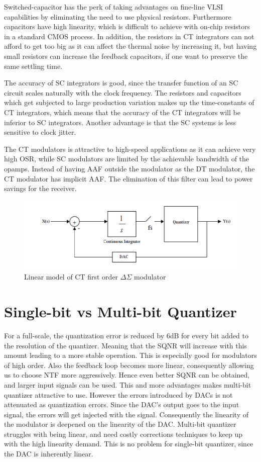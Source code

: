 Switched-capacitor has the perk of taking advantages on fine-line VLSI capabilities by eliminating the need to use physical resistors. Furthermore capacitors have high linearity, which is difficult to achieve with on-chip resistors in a standard CMOS process. In addition, the resistors in CT integrators can not afford to get too big as it can affect the thermal noise by increasing it, but having small resistors can increase the feedback capacitors, if one want to preserve the same settling time. 

The accuracy of SC integrators is good, since the transfer function of an SC circuit scales naturally with the clock frequency. The resistors and capacitors which get subjected to large production variation makes up the time-constants of CT integrators, which means that the accuracy of the CT integrators will be inferior to SC integrators\cite[Ch.6.6]{Richard}. Another advantage is that the SC systems is less sensitive to clock jitter.

The CT modulators is attractive to high-speed applications as it can achieve very high OSR, while SC modulators are limited by the achievable bandwidth of the opamps. Instead of having AAF outside the modulator as the DT modulator, the CT modulator has implicit AAF. The elimination of this filter can lead to power savings for the receiver.

\begin{figure}[H]
\centering
\includegraphics[scale=0.9]{images/cont.png}
\caption{Linear model of CT first order $\Delta\Sigma$ modulator}
\label{fig:cont}
\end{figure}

\section{Single-bit vs Multi-bit Quantizer}
For a full-scale, the quantization error is reduced by 6dB for every bit added to the resolution of the quantizer\cite[Ch.6]{Richard}. Meaning that the SQNR will increase with this amount leading to a more stable operation. This is especially good for modulators of high order. Also the feedback loop becomes more linear, consequently allowing us to choose NTF more aggressively. Hence even better SQNR can be obtained, and larger input signals can be used. This and more advantages makes multi-bit quantizer attractive to use. However the errors introduced by DACs is not attenuated as quantization errors. Since the DAC's output goes to the input signal, the errors will get injected with the signal. Consequently the linearity of the modulator is deepened on the  linearity of the DAC. Multi-bit quantizer struggles with being linear, and need costly corrections techniques to keep up with the high linearity demand. This is no problem for single-bit quantizer, since the DAC is inherently linear.

